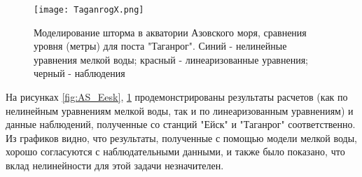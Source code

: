 \begin{figure}[htb!]
	\center
	\texttt{[image: TaganrogX.png]}
	\caption{Моделирование шторма в акватории Азовского моря, сравнения уровня (метры) для поста "Таганрог". 
		 Синий - нелинейные уравнения мелкой воды; красный - линеаризованные уравнения; черный - наблюдения}
	\label{fig:AS_Taganrog}
\end{figure}

На рисунках \ref{fig:AS_Eesk}, \ref{fig:AS_Taganrog} продемонстрированы результаты расчетов (как по нелинейным уравнениям мелкой воды, так и по линеаризованным уравнениям) и данные наблюдений, полученные со станций "Ейск" и  "Таганрог" соответственно.
Из графиков видно, 
что результаты, полученные с помощью модели мелкой воды, хорошо согласуются с наблюдательными данными, и также было показано, что вклад нелинейности для этой задачи незначителен.

\FloatBarrier